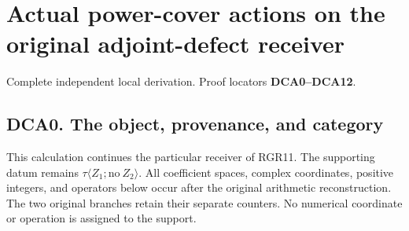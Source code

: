 \section{Actual power-cover actions on the original adjoint-defect
receiver}\label{actual-power-cover-actions-on-the-original-adjoint-defect-receiver}

Complete independent local derivation. Proof locators
\textbf{DCA0--DCA12}.

\subsection{DCA0. The object, provenance, and
category}\label{dca0.-the-object-provenance-and-category}

This calculation continues the particular receiver of RGR11. The
supporting datum remains \(\tau\langle Z_1;\mathrm{no}\ Z_2\rangle\).
All coefficient spaces, complex coordinates, positive integers, and
operators below occur after the original arithmetic reconstruction. The
two original branches retain their separate counters. No numerical
coordinate or operation is assigned to the support.

